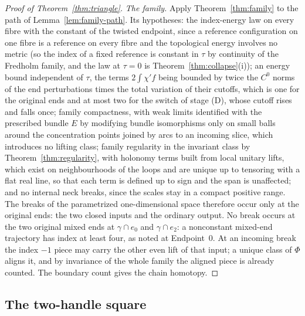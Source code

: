 \documentclass[11pt]{amsart}
\theoremstyle{definition}
\theoremstyle{remark}
\theoremstyle{plain}
\numberwithin{equation}{section}
\begin{document}
\begin{proof}[Proof of Theorem~\ref{thm:triangle}]
\emph{The family.} Apply Theorem~\ref{thm:family} to the path of
Lemma~\ref{lem:family-path}. Its hypotheses: the index-energy law on every
fibre with the constant of the twisted endpoint, since a reference
configuration on one fibre is a reference on every fibre and the
topological energy involves no metric (so the index of a fixed reference
is constant in $\tau$ by continuity of the Fredholm family, and the law at
$\tau=0$ is Theorem~\ref{thm:collapse}(i)); an energy bound independent of
$\tau$, the terms $2\int\chi'f$ being bounded by twice the $C^0$ norms of the
end perturbations times the total variation of their cutoffs, which is one for the original
ends and at most two for the switch of stage (D), whose cutoff rises and falls once; family compactness, with weak limits identified
with the prescribed bundle $E$ by modifying bundle isomorphisms only on
small balls around the concentration points joined by arcs to an incoming
slice, which introduces no lifting class; family regularity in the invariant
class by Theorem~\ref{thm:regularity}, with holonomy terms built from local
unitary lifts, which exist on neighbourhoods of the loops and are unique up
to tensoring with a flat real line, so that each term is defined up to sign
and the span is unaffected; and no internal neck breaks, since the scales
stay in a compact positive range. The breaks of the parametrized
one-dimensional space therefore occur only at the original ends: the two
closed inputs and the ordinary output. No break occurs at the two original mixed
ends at $\gamma\cap e_0$ and $\gamma\cap e_2$: a nonconstant mixed-end trajectory has
index at least four, as noted at Endpoint~$0$. At an incoming break the index $-1$
piece may carry the other even lift of that input; a unique class of $\Phi$
aligns it, and by invariance of the whole family the aligned piece is
already counted. The boundary count gives the chain homotopy.
\end{proof}

\subsection{The two-handle square}
\end{document}
